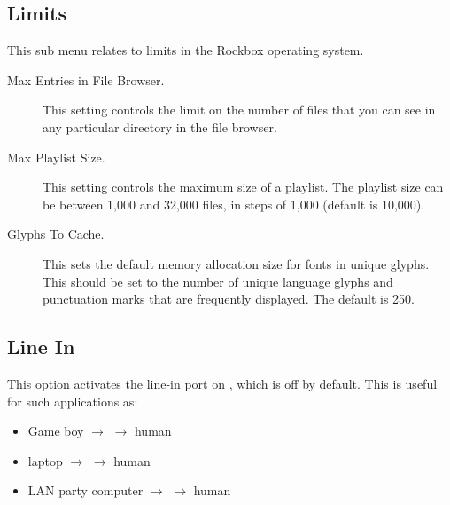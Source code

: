 \subsection{Limits}
This sub menu relates to limits in the Rockbox operating system.
  \begin{description}
    \item [Max Entries in File Browser.] This setting controls the limit on
    the number of files that you can see in any particular directory in the
    file browser. 


    \item [Max Playlist Size.] This setting controls the maximum size of
    a playlist. The playlist size can be between 1,000 and 32,000 files,
    in steps of 1,000 (default is 10,000). 

    \item [Glyphs To Cache.] This sets the default memory allocation size
    for fonts in unique glyphs. This should be set to the number of unique
    language glyphs and punctuation marks that are frequently displayed.
    The default is 250.
  \end{description}
  {
    \subsection{Line In} This option activates the line-in port on \dap, which is
      off by default. This is useful for such applications as:
      \begin{itemize}
      \item Game boy $\rightarrow$ \dap $\rightarrow$ human
      \item laptop $\rightarrow$ \dap $\rightarrow$ human
      \item LAN party computer $\rightarrow$ \dap $\rightarrow$ human
      \end{itemize}
  }
